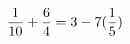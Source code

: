 \documentclass[preview]{standalone}
\begin{document}
\begin{align*}
\special{dvisvgm:raw <g id='unique000'>}\frac{1}{10} + \frac{6}{4} = 3 - 7(\frac{1}{5})\special{dvisvgm:raw </g>}
\end{align*}
\end{document}
